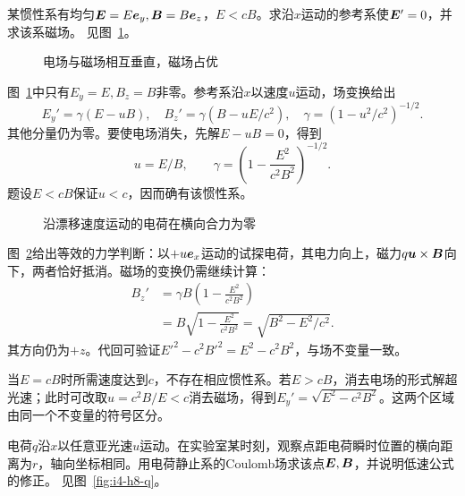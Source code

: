 \begin{exercise}[消去交叉场中的电场]\label{ex:i4-h7}
某惯性系有均匀$\bm{E}=E\bm{e}_y,\bm{B}=B\bm{e}_z$，$E<cB$。求沿$x$运动的参考系使$\bm{E}'=0$，并求该系磁场。 见图~\ref{fig:i4-h7-q}。
\end{exercise}

\begin{figure}[H]\centering
{}
\caption{电场与磁场相互垂直，磁场占优}\label{fig:i4-h7-q}
\end{figure}
\begin{solution}
图~\ref{fig:i4-h7-q}中只有$E_y=E,B_z=B$非零。参考系沿$x$以速度$u$运动，场变换给出
\[
E_y'=\gamma(E-uB),\quad
B_z'=\gamma(B-uE/c^2),\quad
\gamma=(1-u^2/c^2)^{-1/2}.
\]
其他分量仍为零。要使电场消失，先解$E-uB=0$，得到
\[
\boxed{u=E/B},\qquad
\gamma=\left(1-\frac{E^2}{c^2B^2}\right)^{-1/2}.
\]
题设$E<cB$保证$u<c$，因而确有该惯性系。
\begin{figure}[H]\centering
{}
\caption{沿漂移速度运动的电荷在横向合力为零}\label{fig:i4-h7-s}
\end{figure}
图~\ref{fig:i4-h7-s}给出等效的力学判断：以$+u\bm{e}_x$运动的试探电荷，其电力向上，磁力$q\bm{u}\times\bm{B}$向下，两者恰好抵消。磁场的变换仍需继续计算：
\[
\begin{aligned}
B_z'&=\gamma B\left(1-\frac{E^2}{c^2B^2}\right)\\
&=B\sqrt{1-\frac{E^2}{c^2B^2}}
=\boxed{\sqrt{B^2-E^2/c^2}}.
\end{aligned}
\]
其方向仍为$+z$。代回可验证$E'^2-c^2B'^2=E^2-c^2B^2$，与场不变量一致。

当$E=cB$时所需速度达到$c$，不存在相应惯性系。若$E>cB$，消去电场的形式解超光速；此时可改取$u=c^2B/E<c$消去磁场，得到$E_y'=\sqrt{E^2-c^2B^2}$。这两个区域由同一个不变量的符号区分。
\end{solution}

\begin{exercise}[匀速点电荷的横向场]\label{ex:i4-h8}
电荷$q$沿$x$以任意亚光速$u$运动。在实验室某时刻，观察点距电荷瞬时位置的横向距离为$r$，轴向坐标相同。用电荷静止系的Coulomb场求该点$\bm{E},\bm{B}$，并说明低速公式的修正。 见图~\ref{fig:i4-h8-q}。
\end{exercise}

